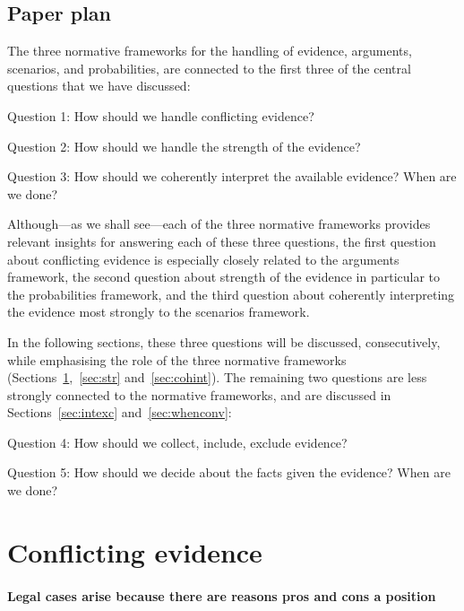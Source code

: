 \documentclass[10pt]{article}
\begin{document}
\subsection{Paper plan}

The three normative frameworks for the handling of evidence, arguments, scenarios, and probabilities, are connected to the first three of the central questions that we have discussed:

\begin{description}
	\item Question 1: How should we handle conflicting evidence?
	\item Question 2: How should we handle the strength of the evidence?
	\item Question 3: How should we coherently interpret the available evidence? 
When are we done?
\end{description}

\noindent Although---as we shall see---each of the three normative frameworks provides relevant insights for answering each of these three questions, the first question about conflicting evidence is especially closely related to the arguments framework, the second question about strength of the evidence in particular to the probabilities framework, and the third question about coherently interpreting the evidence most strongly to the scenarios framework.

In the following sections, these three questions will be discussed, consecutively, while emphasising the role of the three normative frameworks (Sections~\ref{sec:conf},~\ref{sec:str} and~\ref{sec:cohint}). The remaining two questions are less strongly connected to the normative frameworks, and are discussed in Sections~\ref{sec:intexc} and~\ref{sec:whenconv}:

\begin{description}
	\item Question 4: How should we collect, include, exclude evidence?
	\item Question 5: How should we decide about the facts given the evidence? When are we done?
\end{description}


\section{Conflicting evidence}
\label{sec:conf}
 	
\paragraph{Legal cases arise because there are reasons pros and cons a position} 
\end{document}

